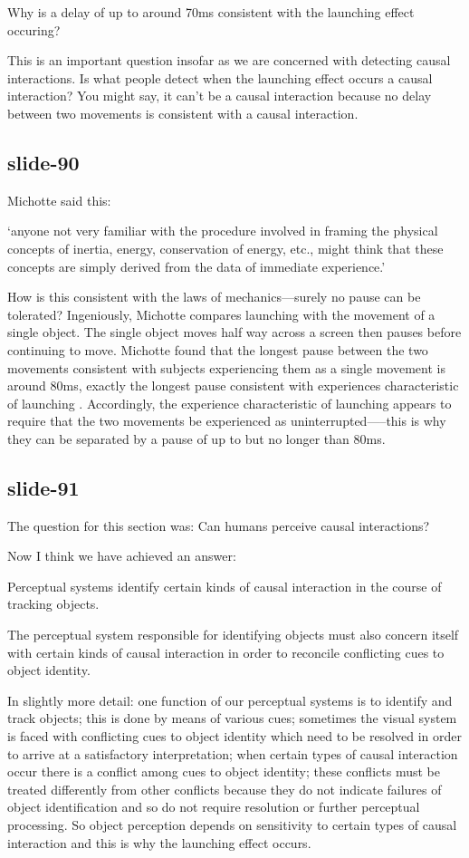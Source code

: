 \documentclass[12pt,\papersize]{extarticle}
\begin{document}
Why is a delay of up to around 70ms consistent with the launching effect occuring?
 
This is an important question insofar as we are concerned with detecting causal interactions.
Is what people detect when the launching effect occurs a causal interaction?
You might say, it can't be a causal interaction 
because no delay between two movements is consistent with a causal interaction.
 
\subsection{slide-90}
Michotte said this:
 
‘anyone not very familiar with the procedure involved in framing the physical concepts of 
inertia, energy, conservation of energy, etc., might think that these concepts are simply 
derived from the data of immediate experience.’
\citep[p.\ 223]{Michotte:1946nz}
 
How is this consistent with the laws of mechanics—surely no pause can be tolerated? 
Ingeniously, Michotte compares launching with the movement of a single object. The single 
object moves half way across a screen then pauses before continuing to move. Michotte found 
that the longest pause between the two movements consistent with subjects experiencing them 
as a single movement is around 80ms, exactly the longest pause consistent with experiences 
characteristic of launching \citep[pp.\ 91--8, 124]{Michotte:1946nz}. Accordingly, the 
experience characteristic of launching appears to require that the two movements be 
experienced as uninterrupted—--this is why they can be separated by a pause of up to but 
no longer than 80ms.
 
\subsection{slide-91}
The question for this section was:
Can humans perceive causal interactions?
 
Now I think we have achieved an answer:
 
Perceptual systems identify certain kinds of causal interaction in the course of 
tracking objects.
 
The perceptual system responsible for identifying objects must also concern itself with certain 
kinds of causal interaction in order to reconcile conflicting cues to object identity.
 
In slightly more detail: one function of our perceptual systems is to identify and track 
objects; this is done by means of various cues; sometimes the visual system is faced with 
conflicting cues to object identity which need to be resolved in order to arrive at a 
satisfactory interpretation; when certain types of causal interaction occur there is a 
conflict among cues to object identity; these conflicts must be treated differently from other 
conflicts because they do not indicate failures of object identification and so do not  
require resolution or further perceptual processing. 
So object perception depends on sensitivity to certain types of causal interaction and this is 
why the launching effect occurs.
 
\end{document}
